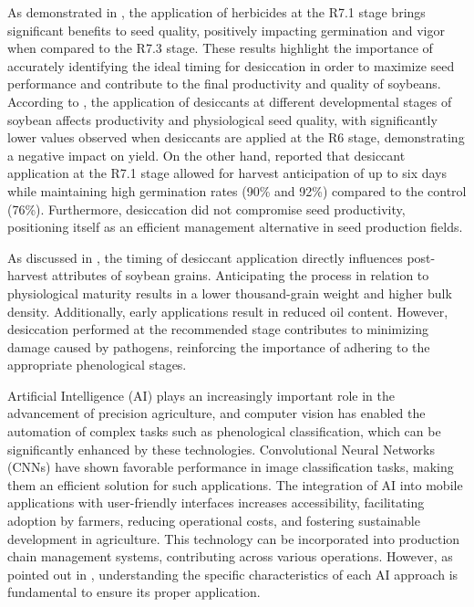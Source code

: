 \documentclass[10pt,conference]{IEEEtran}
\begin{document}
As demonstrated in \cite{castro2022qualidade}, the application of herbicides at the R7.1 stage brings significant benefits to seed quality, positively impacting germination and vigor when compared to the R7.3 stage. These results highlight the importance of accurately identifying the ideal timing for desiccation in order to maximize seed performance and contribute to the final productivity and quality of soybeans. According to \cite{pereira2015dessecacao}, the application of desiccants at different developmental stages of soybean affects productivity and physiological seed quality, with significantly lower values observed when desiccants are applied at the R6 stage, demonstrating a negative impact on yield. On the other hand, \cite{lima2024dessecacao} \cite{cella2014efeito} \cite{inoue2012determinacao} reported that desiccant application at the R7.1 stage allowed for harvest anticipation of up to six days while maintaining high germination rates (90\% and 92\%) compared to the control (76\%). Furthermore, desiccation did not compromise seed productivity, positioning itself as an efficient management alternative in seed production fields. 

As discussed in \cite{botelho2022epocas}, the timing of desiccant application directly influences post-harvest attributes of soybean grains. Anticipating the process in relation to physiological maturity results in a lower thousand-grain weight and higher bulk density. Additionally, early applications result in reduced oil content. However, desiccation performed at the recommended stage contributes to minimizing damage caused by pathogens, reinforcing the importance of adhering to the appropriate phenological stages. 

Artificial Intelligence (AI) plays an increasingly important role in the advancement of precision agriculture, and computer vision has enabled the automation of complex tasks such as phenological classification, which can be significantly enhanced by these technologies. Convolutional Neural Networks (CNNs) have shown favorable performance in image classification tasks, making them an efficient solution for such applications. The integration of AI into mobile applications with user-friendly interfaces increases accessibility, facilitating adoption by farmers, reducing operational costs, and fostering sustainable development in agriculture. This technology can be incorporated into production chain management systems, contributing across various operations. However, as pointed out in \cite{borba2022gestao}, understanding the specific characteristics of each AI approach is fundamental to ensure its proper application. 
\end{document}
